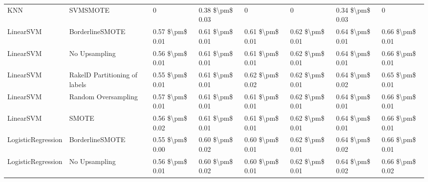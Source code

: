\begin{tabular}{llllllll}
                            KNN &                      SVMSMOTE &               0 &           0.38 \$\textbackslash pm\$ 0.03 &                     0 &                      0 &                         0.34 \$\textbackslash pm\$ 0.03 &                   0 \\
                      LinearSVM &               BorderlineSMOTE & 0.57 \$\textbackslash pm\$ 0.01 &           0.61 \$\textbackslash pm\$ 0.01 &       0.61 \$\textbackslash pm\$ 0.01 &        0.62 \$\textbackslash pm\$ 0.01 &                         0.64 \$\textbackslash pm\$ 0.01 &     0.66 \$\textbackslash pm\$ 0.01 \\
                      LinearSVM &                 No Upsampling & 0.56 \$\textbackslash pm\$ 0.01 &           0.61 \$\textbackslash pm\$ 0.01 &       0.61 \$\textbackslash pm\$ 0.01 &        0.62 \$\textbackslash pm\$ 0.01 &                         0.64 \$\textbackslash pm\$ 0.01 &     0.66 \$\textbackslash pm\$ 0.01 \\
                      LinearSVM & RakelD Partitioning of labels & 0.55 \$\textbackslash pm\$ 0.01 &           0.61 \$\textbackslash pm\$ 0.01 &       0.62 \$\textbackslash pm\$ 0.02 &        0.62 \$\textbackslash pm\$ 0.01 &                         0.64 \$\textbackslash pm\$ 0.02 &     0.65 \$\textbackslash pm\$ 0.01 \\
                      LinearSVM &           Random Oversampling & 0.57 \$\textbackslash pm\$ 0.01 &           0.61 \$\textbackslash pm\$ 0.01 &       0.61 \$\textbackslash pm\$ 0.01 &        0.62 \$\textbackslash pm\$ 0.01 &                         0.64 \$\textbackslash pm\$ 0.01 &     0.66 \$\textbackslash pm\$ 0.01 \\
                      LinearSVM &                         SMOTE & 0.56 \$\textbackslash pm\$ 0.02 &           0.61 \$\textbackslash pm\$ 0.01 &       0.61 \$\textbackslash pm\$ 0.01 &        0.62 \$\textbackslash pm\$ 0.01 &                         0.64 \$\textbackslash pm\$ 0.01 &     0.66 \$\textbackslash pm\$ 0.01 \\
             LogisticRegression &               BorderlineSMOTE & 0.55 \$\textbackslash pm\$ 0.00 &           0.60 \$\textbackslash pm\$ 0.02 &       0.60 \$\textbackslash pm\$ 0.01 &        0.62 \$\textbackslash pm\$ 0.01 &                         0.64 \$\textbackslash pm\$ 0.02 &     0.66 \$\textbackslash pm\$ 0.01 \\
             LogisticRegression &                 No Upsampling & 0.56 \$\textbackslash pm\$ 0.01 &           0.60 \$\textbackslash pm\$ 0.02 &       0.60 \$\textbackslash pm\$ 0.01 &        0.62 \$\textbackslash pm\$ 0.01 &                         0.64 \$\textbackslash pm\$ 0.02 &     0.66 \$\textbackslash pm\$ 0.02 \\

\end{tabular}
